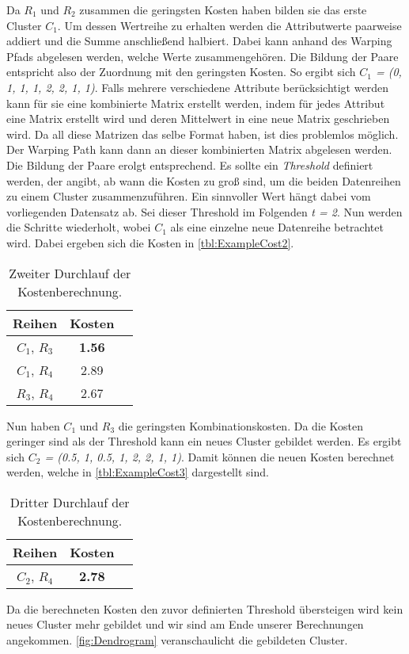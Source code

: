 Da \emph{$R_{1}$} und \emph{$R_{2}$} zusammen die geringsten Kosten haben bilden sie das erste Cluster \emph{$C_{1}$}.
Um dessen Wertreihe zu erhalten werden die Attributwerte paarweise addiert und die Summe anschließend halbiert.
Dabei kann anhand des Warping Pfads abgelesen werden, welche Werte zusammengehören.
Die Bildung der Paare entspricht also der Zuordnung mit den geringsten Kosten.
So ergibt sich \emph{$C_{1}$ = (0, 1, 1, 1, 2, 2, 1, 1)}.
Falls mehrere verschiedene Attribute berücksichtigt werden kann für sie eine kombinierte Matrix erstellt werden,
indem für jedes Attribut eine Matrix erstellt wird und deren Mittelwert in eine neue Matrix geschrieben wird.
Da all diese Matrizen das selbe Format haben, ist dies problemlos möglich.
Der Warping Path kann dann an dieser kombinierten Matrix abgelesen werden.
Die Bildung der Paare erolgt entsprechend.
Es sollte ein \emph{Threshold} definiert werden,
der angibt, ab wann die Kosten zu groß sind, um die beiden Datenreihen zu einem Cluster zusammenzuführen.
Ein sinnvoller Wert hängt dabei vom vorliegenden Datensatz ab.
Sei dieser Threshold im Folgenden \emph{t = 2}.
Nun werden die Schritte wiederholt, wobei \emph{$C_{1}$} als eine einzelne neue Datenreihe betrachtet wird.
Dabei ergeben sich die Kosten in \autoref{tbl:ExampleCost2}.
\begin{table}[ht]
    \begin{center}
    \begin{tabular}{ |c|c|c| } 
     \hline
     Reihen & Kosten \\
     \hline \hline
     $C_{1}$, $R_{3}$ & \textbf{1.56} \\
     \hline
     $C_{1}$, $R_{4}$ & 2.89 \\
     \hline
     $R_{3}$, $R_{4}$ & 2.67 \\
     \hline
    \end{tabular}
    \caption{Zweiter Durchlauf der Kostenberechnung.}
    \label{tbl:ExampleCost2}
    \end{center}
\end{table}
Nun haben \emph{$C_{1}$} und \emph{$R_{3}$} die geringsten Kombinationskosten.
Da die Kosten geringer sind als der Threshold kann ein neues Cluster gebildet werden.
Es ergibt sich \emph{$C_{2}$ = (0.5, 1, 0.5, 1, 2, 2, 1, 1)}.
Damit können die neuen Kosten berechnet werden,
welche in \autoref{tbl:ExampleCost3} dargestellt sind.
\begin{table}[ht]
\begin{center}
    \begin{tabular}{ |c|c|c| } 
     \hline
     Reihen & Kosten \\
     \hline \hline
     $C_{2}$, $R_{4}$ & \textbf{2.78} \\
     \hline
    \end{tabular}
    \caption{Dritter Durchlauf der Kostenberechnung.}
    \label{tbl:ExampleCost3}
    \end{center}
\end{table}
Da die berechneten Kosten den zuvor definierten Threshold übersteigen wird kein neues Cluster mehr gebildet
und wir sind am Ende unserer Berechnungen angekommen.
\autoref{fig:Dendrogram} veranschaulicht die gebildeten Cluster.

